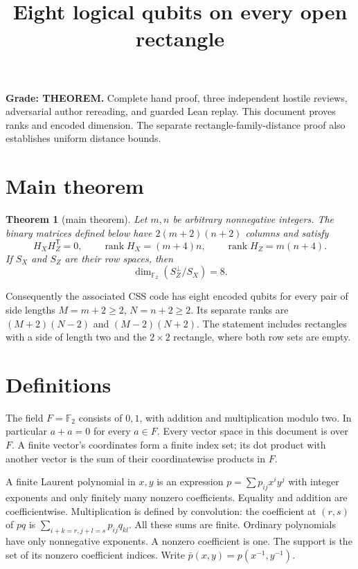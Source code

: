 \documentclass{article}
\title{Eight logical qubits on every open rectangle}
\author{}
\date{}
\newtheorem{theorem}{Theorem}
\begin{document}
\maketitle

\textbf{Grade: THEOREM.} Complete hand proof, three independent hostile reviews,
adversarial author rereading, and guarded Lean replay. This document proves
ranks and encoded dimension. The separate rectangle-family-distance proof
also establishes uniform distance bounds.

\section{Main theorem}\label{sec:main-theorem}

\begin{theorem}[main theorem]\label{thm:main}
Let \(m,n\) be arbitrary nonnegative integers. The binary matrices defined below have
\(2(m+2)(n+2)\) columns and satisfy
\begin{equation}\label{eq:main-ranks}
 H_XH_Z^{\mathsf T}=0,\qquad
 \operatorname{rank} H_X=(m+4)n,\qquad
 \operatorname{rank} H_Z=m(n+4).
\end{equation}
If \(S_X\) and \(S_Z\) are their row spaces, then
\begin{equation}\label{eq:main-dimension}
 \dim_{\mathbb F_2}(S_Z^\perp/S_X)=8.
\end{equation}
\end{theorem}

Consequently the associated CSS code has eight encoded qubits for every pair of side
lengths \(M=m+2\ge 2\), \(N=n+2\ge 2\). Its separate ranks are \((M+2)(N-2)\) and
\((M-2)(N+2)\). The statement includes rectangles with a side of length two and the
\(2\times 2\) rectangle, where both row sets are empty.

\section{Definitions}\label{sec:definitions}

The field \(F=\mathbb F_2\) consists of \(0,1\), with addition and multiplication
modulo two. In particular \(a+a=0\) for every \(a\in F\). Every vector space in this
document is over \(F\). A finite vector's coordinates form a finite index set; its dot
product with another vector is the sum of their coordinatewise products in \(F\).

A finite Laurent polynomial in \(x,y\) is an expression
\(p=\sum p_{ij}x^iy^j\) with integer exponents and only finitely many nonzero
coefficients. Equality and addition are coefficientwise. Multiplication is defined by
convolution: the coefficient at \((r,s)\) of \(pq\) is
\(\sum_{i+k=r,j+l=s} p_{ij}q_{kl}\). All these sums are finite. Ordinary polynomials
have only nonnegative exponents. A nonzero coefficient is one. The support is the set
of its nonzero coefficient indices. Write \(\bar p(x,y)=p(x^{-1},y^{-1})\).
\end{document}
